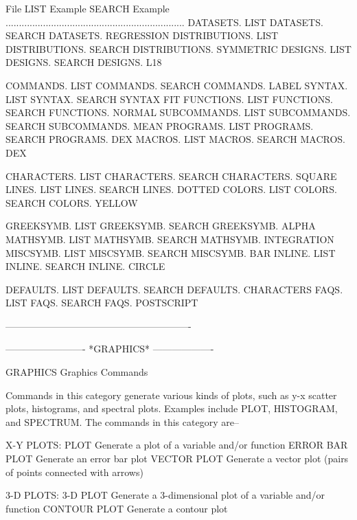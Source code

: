      File         LIST Example        SEARCH Example
  ...................................................................
   DATASETS.      LIST DATASETS.      SEARCH DATASETS. REGRESSION
   DISTRIBUTIONS. LIST DISTRIBUTIONS. SEARCH DISTRIBUTIONS. SYMMETRIC
   DESIGNS.       LIST DESIGNS.       SEARCH DESIGNS. L18
 
   COMMANDS.      LIST COMMANDS.      SEARCH COMMANDS. LABEL
   SYNTAX.        LIST SYNTAX.        SEARCH SYNTAX FIT
   FUNCTIONS.     LIST FUNCTIONS.     SEARCH FUNCTIONS. NORMAL
   SUBCOMMANDS.   LIST SUBCOMMANDS.   SEARCH SUBCOMMANDS. MEAN
   PROGRAMS.      LIST PROGRAMS.      SEARCH PROGRAMS. DEX
   MACROS.        LIST MACROS.        SEARCH MACROS. DEX
 
   CHARACTERS.    LIST CHARACTERS.    SEARCH CHARACTERS. SQUARE
   LINES.         LIST LINES.         SEARCH LINES. DOTTED
   COLORS.        LIST COLORS.        SEARCH COLORS. YELLOW
 
   GREEKSYMB.     LIST GREEKSYMB.     SEARCH GREEKSYMB. ALPHA
   MATHSYMB.      LIST MATHSYMB.      SEARCH MATHSYMB. INTEGRATION
   MISCSYMB.      LIST MISCSYMB.      SEARCH MISCSYMB. BAR
   INLINE.        LIST INLINE.        SEARCH INLINE. CIRCLE
 
   DEFAULTS.      LIST DEFAULTS.      SEARCH DEFAULTS. CHARACTERS
   FAQS.          LIST FAQS.          SEARCH FAQS. POSTSCRIPT
 
----------------------------------------------------------
 
 
 
 
 
 
-------------------------  *GRAPHICS*  -------------------
 
GRAPHICS
Graphics Commands
 
Commands in this category generate various kinds of plots, such as
y-x scatter plots, histograms, and spectral plots.  Examples include
PLOT, HISTOGRAM, and SPECTRUM.  The commands in this category are--
 
X-Y PLOTS:
   PLOT                  Generate a plot of a variable and/or function
   ERROR BAR PLOT        Generate an error bar plot
   VECTOR PLOT           Generate a vector plot (pairs of points
                         connected with arrows)
 
3-D PLOTS:
   3-D PLOT              Generate a 3-dimensional plot of a variable
                         and/or function
   CONTOUR PLOT          Generate a contour plot
 
